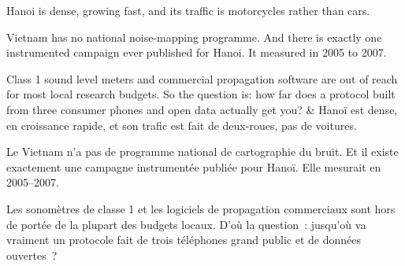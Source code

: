 \documentclass[10pt,a4paper]{article}
\begin{document}
\begin{say}
Hanoi is dense, growing fast, and its traffic is motorcycles rather than cars.

Vietnam has no national noise-mapping programme. And there is exactly one
instrumented campaign ever published for Hanoi. It measured in 2005 to 2007.

Class 1 sound level meters and commercial propagation software are out of reach
for most local research budgets. So the question is: how far does a protocol
built from three consumer phones and open data actually get you?
&
Hanoï est dense, en croissance rapide, et son trafic est fait de deux-roues, pas
de voitures.

Le Vietnam n'a pas de programme national de cartographie du bruit. Et il existe
exactement une campagne instrumentée publiée pour Hanoï. Elle mesurait en
2005--2007.

Les sonomètres de classe 1 et les logiciels de propagation commerciaux sont hors
de portée de la plupart des budgets locaux. D'où la question~: jusqu'où va
vraiment un protocole fait de trois téléphones grand public et de données
ouvertes~?
\end{say}
\end{document}
